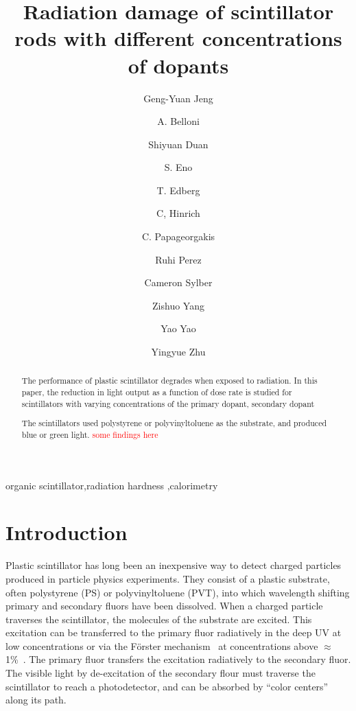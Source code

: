 \documentclass[review]{elsarticle}
\begin{document}
\begin{frontmatter}

\title{Radiation damage of scintillator rods with different concentrations of dopants
}


\author[umd]{Geng-Yuan Jeng}
\author[umd]{A. Belloni}
\author[umd]{Shiyuan Duan}
\author[umd]{S. Eno}
\author[umd]{T. Edberg}
\author[umd]{C, Hinrich}
\author[umd]{C. Papageorgakis}
\author[umd]{Ruhi Perez}
\author[umd]{Cameron Sylber}
\author[umd]{Zishuo Yang}
\author[umd]{Yao Yao}
\author[umd]{Yingyue Zhu}

\address[umd]{Dept. Physics, U. Maryland, College Park MD 30742 USA}



\begin{abstract}
The performance of plastic scintillator degrades when exposed to radiation. 
In this paper, the reduction in light output  as a function of dose rate
is studied for scintillators
with varying concentrations of the primary dopant, secondary dopant

The scintillators used polystyrene or polyvinyltoluene as the substrate, and
produced blue or green light. \textcolor{red}{some findings here}
\end{abstract}

\begin{keyword}
organic scintillator\sep radiation hardness \sep calorimetry
\end{keyword}

\end{frontmatter}

\linenumbers

\section{Introduction}
Plastic scintillator has long been an inexpensive way to detect charged particles produced in particle physics experiments.
They consist of a plastic substrate, 
often polystyrene (PS) or polyvinyltoluene (PVT),
into which wavelength 
shifting primary and secondary fluors have been dissolved.
When a charged particle traverses the scintillator, the molecules of the substrate are excited.  
This excitation can be transferred to the primary fluor radiatively in the deep UV at low concentrations or via the F{\"o}rster 
mechanism~\cite{forster} at concentrations above $\approx$ 1\%~\cite{birks}.  
The primary fluor transfers the excitation radiatively to the secondary fluor.  
The visible light by de-excitation of the secondary flour
must traverse the scintillator to reach a photodetector, and can be absorbed by ``color centers'' along its path.
\end{document}

